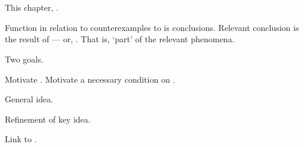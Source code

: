 \chapter{}
\label{cha:typical}
\nocite{Wilson:1994aa}
\nocite{Goodman:1983aa}

\begin{note}
  This chapter, \tC{}.

  Function in relation to counterexamples to \issueConstraint{} is conclusions.
  Relevant conclusion is the result of \tC{} --- or, \tC[reasoning]{}.
  That is, `part' of the relevant phenomena.

  Two goals.

  Motivate \tC{}.
  Motivate a necessary condition on \tC{}.
\end{note}

\begin{note}
  \begin{TOCEnum}
  \item

    General idea.
  \item

    Refinement of key idea.
  \item

    Link \tC{} to .
  \end{TOCEnum}
\end{note}

\section{}
\label{cha:typical:int}

